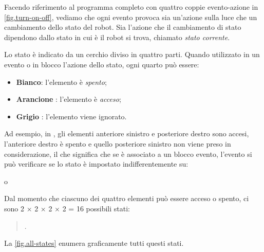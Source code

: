 Facendo riferimento al programma completo con quattro coppie evento-azione
in \cref{fig.turn-on-off}, vediamo che
ogni evento provoca sia un'azione sulla luce che un cambiamento dello stato
del robot. Sia l'azione che il cambiamento di stato dipendono dallo stato in cui è il robot si trova, chiamato \emph{stato corrente}.

\newpage


Lo stato è indicato da un cerchio diviso in quattro parti.
Quando utilizzato in un evento o in blocco l'azione dello stato, ogni quarto può essere:
\begin{itemize}
\item \textbf{Bianco}: l'elemento è \emph{spento};
\item \textbf{Arancione} : l'elemento è \emph{acceso};
\item \textbf{Grigio} : l'elemento viene ignorato.
\end{itemize}

Ad esempio, in , gli elementi anteriore sinistro e posteriore destro sono accesi, l'anteriore destro è spento e quello posteriore sinistro non viene preso in considerazione,
il che significa che se  è associato a un blocco evento, l'evento si può verificare se lo stato è impostato indifferentemente su:
\begin{center}
\centering {}\quad o \quad {}
\end{center}

Dal momento che ciascuno dei quattro elementi può essere acceso o spento, ci sono 2 $\times$ 2 $\times$ 2 $\times$ 2  = 16 possibili stati:
\begin{quote}
.
\end{quote}
La \cref{fig.all-states} enumera graficamente tutti questi stati.


